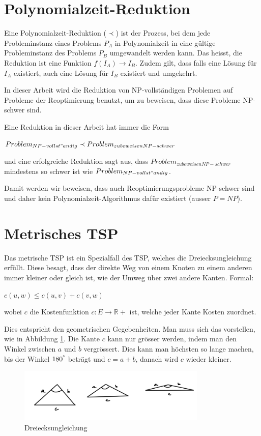 \documentclass[a4paper,11pt]{scrreprt}
\begin{document}
\section{Polynomialzeit-Reduktion}

Eine Polynomialzeit-Reduktion ($\prec$) ist der Prozess, bei dem jede Probleminstanz eines Problems $P_A$ in Polynomialzeit in eine gültige Probleminstanz des Problems $P_B$ umgewandelt werden kann. Das heisst, die 
Reduktion ist eine Funktion $f(I_A) \rightarrow I_B$. Zudem gilt, dass falls
eine Lösung für $I_A$ existiert, auch eine Lösung für $I_B$ existiert und umgekehrt.

In dieser Arbeit wird die Reduktion von NP-vollständigen Problemen auf Probleme
der Reoptimierung benutzt, um zu beweisen, dass diese Probleme NP-schwer sind.

Eine Reduktion in dieser Arbeit hat immer die Form 

$Problem_{NP-vollst"andig} \prec Problem_{zu beweisen NP-schwer}$ 

und eine erfolgreiche Reduktion sagt aus, dass $Problem_{zu  beweisen NP-schwer}$ mindestens so schwer ist wie $Problem_{NP-vollst"andig}$.

Damit werden wir beweisen, dass auch Reoptimierungsprobleme NP-schwer sind und daher kein Polynomialzeit-Algorithmus dafür existiert (ausser $P = NP$).

\section{Metrisches TSP}

Das metrische TSP ist ein Spezialfall des TSP, welches die Dreiecksungleichung erfüllt. Diese besagt, dass der direkte Weg von einem Knoten zu einem anderen immer kleiner oder gleich ist, wie der Umweg über zwei andere Kanten. Formal:

$c({u, w}) \le c({u, v}) + c({v, w})$

wobei $c$ die Kostenfunktion $c: E \rightarrow \mathbb{R}+$ ist, welche jeder Kante Kosten zuordnet.

Dies entspricht den geometrischen Gegebenheiten. Man muss sich das vorstellen,
wie in Abbildung \ref{fig:trangle-inequality}. Die Kante $c$ kann nur grösser 
werden, indem man den Winkel zwischen $a$ und $b$ vergrössert. Dies kann man 
höchsten so lange machen, bis der Winkel $180^\degree$ beträgt und $c = a + b$, danach
wird $c$ wieder kleiner.

\begin{figure}
\includegraphics[width=0.8\textwidth]{triangle_inequality1.png}
\caption{Dreiecksungleichung}
\label{fig:trangle-inequality}
\end{figure}
\end{document}
